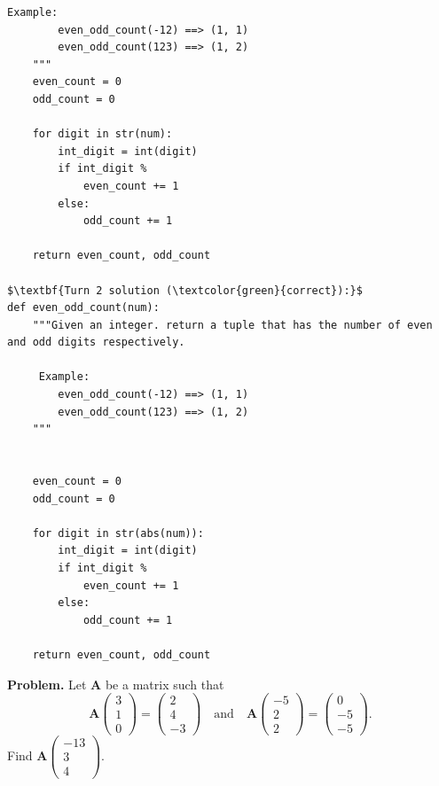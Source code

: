 \begin{appendix}
\begin{lstlisting}[title=HumanEval Example 2,mathescape=true]
     Example:
        even_odd_count(-12) ==> (1, 1)
        even_odd_count(123) ==> (1, 2)
    """
    even_count = 0
    odd_count = 0

    for digit in str(num):
        int_digit = int(digit)
        if int_digit %
            even_count += 1
        else:
            odd_count += 1

    return even_count, odd_count

$\textbf{Turn 2 solution (\textcolor{green}{correct}):}$
def even_odd_count(num):
    """Given an integer. return a tuple that has the number of even and odd digits respectively.

     Example:
        even_odd_count(-12) ==> (1, 1)
        even_odd_count(123) ==> (1, 2)
    """


    even_count = 0
    odd_count = 0

    for digit in str(abs(num)):
        int_digit = int(digit)
        if int_digit %
            even_count += 1
        else:
            odd_count += 1

    return even_count, odd_count
\end{lstlisting}
















\newpage

\begin{tcolorbox}[enhanced=true,breakable=true,fontupper=\small,title=MATH Example 1]
\textbf{Problem.} Let $\mathbf{A}$ be a matrix such that
\[\mathbf{A} \begin{pmatrix} 3 \\ 1 \\ 0 \end{pmatrix} = \begin{pmatrix} 2 \\ 4 \\ -3 \end{pmatrix} \quad \text{and} \quad \mathbf{A} \begin{pmatrix} -5 \\ 2 \\ 2 \end{pmatrix} = \begin{pmatrix} 0 \\ -5 \\ -5 \end{pmatrix}.\]Find $\mathbf{A} \begin{pmatrix} -13 \\ 3 \\ 4 \end{pmatrix}.$


\end{tcolorbox}
\end{appendix}
